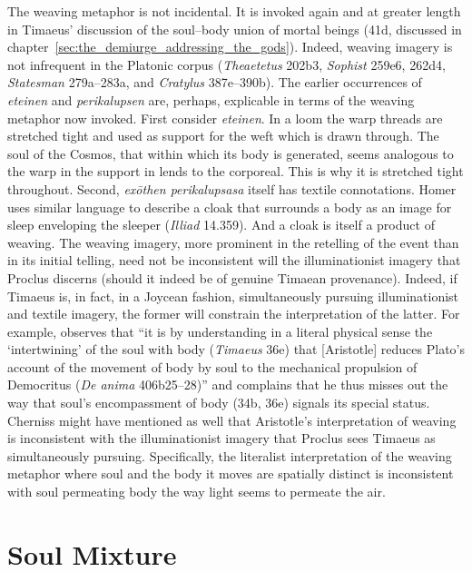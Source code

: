 The weaving metaphor is not incidental. It is invoked again and at greater length in Timaeus' discussion of the soul--body union of mortal beings (41d, discussed in chapter~\ref{sec:the_demiurge_addressing_the_gods}). Indeed, weaving imagery is not infrequent in the Platonic corpus (\emph{Theaetetus} 202b3, \emph{Sophist} 259e6, 262d4, \emph{Statesman} 279a--283a, and \emph{Cratylus} 387e--390b). The earlier occurrences of \emph{eteinen} and \emph{perikalupsen} are, perhaps, explicable in terms of the weaving metaphor now invoked. First consider \emph{eteinen}. In a loom the warp threads are stretched tight and used as support for the weft which is drawn through. The soul of the Cosmos, that within which its body is generated, seems analogous to the warp in the support in lends to the corporeal. This is why it is stretched tight throughout. Second, \emph{exōthen perikalupsasa} itself has textile connotations. Homer uses similar language to describe a cloak that surrounds a body as an image for sleep enveloping the sleeper (\emph{Illiad} 14.359). And a cloak is itself a product of weaving. The weaving imagery, more prominent in the retelling of the event than in its initial telling, need not be inconsistent will the illuminationist imagery that Proclus discerns (should it indeed be of genuine Timaean provenance). Indeed, if Timaeus is, in fact, in a Joycean fashion, simultaneously pursuing illuminationist and textile imagery, the former will constrain the interpretation of the latter. For example, \citet[406]{Cherniss:1944aa} observes that ``it is by understanding in a literal physical sense the `intertwining' of the soul with body (\emph{Timaeus} 36e) that [Aristotle] reduces Plato's account of the movement of body by soul to the mechanical propulsion of Democritus (\emph{De anima} 406b25--28)'' and complains that he thus misses out the way that soul's encompassment of body (34b, 36e) signals its special status. Cherniss might have mentioned as well that Aristotle's interpretation of weaving is inconsistent with the illuminationist imagery that Proclus sees Timaeus as simultaneously pursuing. Specifically, the literalist interpretation of the weaving metaphor where soul and the body it moves are spatially distinct is inconsistent with soul permeating body the way light seems to permeate the air.


\section{Soul Mixture} %
\label{sec:soul_mixture}

